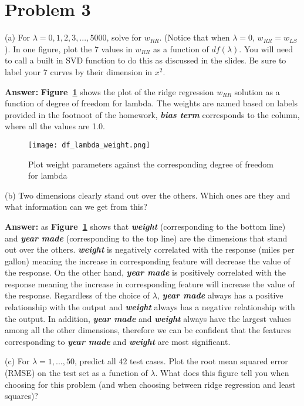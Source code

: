 \documentclass[11pt]{report}
\begin{document}
\pagebreak

\section{Problem 3}
(a) For $\lambda = 0, 1, 2 ,3, ..., 5000$, solve for $w_{RR}$. (Notice that when $\lambda = 0$, $w_{RR} = w_{LS}$). In one figure, plot the 7 values in $w_{RR}$ as a function of $df(\lambda)$. You will need to call a built in SVD function to do this as discussed in the slides. Be sure to label your 7 curves by their dimension in ${x^2}$.

\justify
\textbf{Answer:} \textbf{Figure~\ref{fig:df_lambda_weight}}  shows the plot of the ridge regression $w_{RR}$ solution as a function of degree of freedom for lambda. The weights are named based on labels provided in the footnoot of the homework, \emph{\textbf{bias term}} corresponds to the column, where all the values are 1.0. 

\begin{figure}[h]
\texttt{[image: df\_lambda\_weight.png]}
\centering
\caption{Plot weight parameters against the corresponding degree of freedom for lambda}
\label{fig:df_lambda_weight}
\end{figure}

\justify
(b) Two dimensions clearly stand out over the others. Which ones are they and what information can we get from this?

\justify
\textbf{Answer:} as \textbf{Figure~\ref{fig:df_lambda_weight}} shows that \emph{\textbf{weight}} (corresponding to the bottom line) and \emph{\textbf{year made}} (corresponding to the top line) are the dimensions that stand out over the others. \emph{\textbf{weight}} is negatively correlated with the response (miles per gallon) meaning the increase in corresponding feature will decrease the value of the response. On the other hand, \emph{\textbf{year made}} is positively correlated with the response meaning the increase in corresponding feature will increase the value of the response. Regardless of the choice of $\lambda$,  \emph{\textbf{year made}} always has a positive relationship with the output and \emph{\textbf{weight}} always has a negative relationship with the output. In addition, \emph{\textbf{year made}} and \emph{\textbf{weight}} always have the largest values among all the other dimensions, therefore we can be confident that the features corresponding to \emph{\textbf{year made}} and \emph{\textbf{weight}} are most significant. 

\justify
(c) For $\lambda = 1, ..., 50$, predict all 42 test cases. Plot the root mean squared error (RMSE) on the test set as a function of $\lambda$. What does this figure tell you when choosing for this problem (and when choosing between ridge regression and least squares)?
\end{document}
